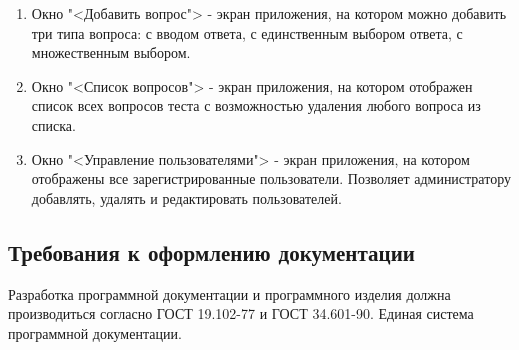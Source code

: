 \begin{enumerate}
	\item Окно "<Добавить вопрос"> - экран приложения, на котором можно добавить три типа вопроса: с вводом ответа, с единственным выбором ответа, с множественным выбором.
	\item Окно "<Список вопросов"> - экран приложения, на котором отображен список всех вопросов теста с возможностью удаления любого вопроса из списка.
	\item Окно "<Управление пользователями"> - экран приложения, на котором отображены все зарегистрированные пользователи. Позволяет администратору добавлять, удалять и редактировать пользователей.
\end{enumerate}

\subsection{Требования к оформлению документации}

Разработка программной документации и программного изделия должна производиться согласно ГОСТ 19.102-77 и ГОСТ 34.601-90. Единая система программной документации.
